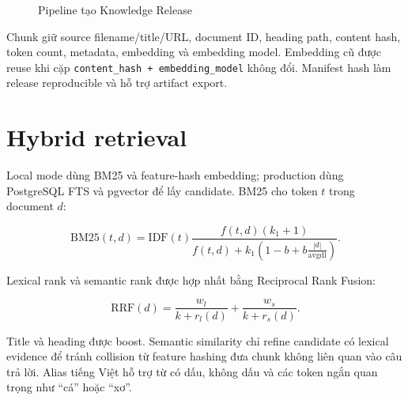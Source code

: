 \documentclass[12pt,a4paper]{report}
\newcommand{\code}[1]{\texttt{#1}}
\begin{document}
\begin{figure}[H]
\centering
{}
\caption{Pipeline tạo Knowledge Release}
\end{figure}

Chunk giữ source filename/title/URL, document ID, heading path, content hash,
token count, metadata, embedding và embedding model. Embedding cũ được reuse
khi cặp \code{content\_hash + embedding\_model} không đổi. Manifest hash làm
release reproducible và hỗ trợ artifact export.

\section{Hybrid retrieval}

Local mode dùng BM25 và feature-hash embedding; production dùng PostgreSQL FTS
và pgvector để lấy candidate. BM25 cho token $t$ trong document $d$:

\begin{equation}
\mathrm{BM25}(t,d)=\mathrm{IDF}(t)\frac{f(t,d)(k_1+1)}
{f(t,d)+k_1(1-b+b\frac{|d|}{\mathrm{avgdl}})}.
\end{equation}

Lexical rank và semantic rank được hợp nhất bằng Reciprocal Rank Fusion:

\begin{equation}
\mathrm{RRF}(d)=\frac{w_l}{k+r_l(d)}+\frac{w_s}{k+r_s(d)}.
\end{equation}

Title và heading được boost. Semantic similarity chỉ refine candidate có
lexical evidence để tránh collision từ feature hashing đưa chunk không liên
quan vào câu trả lời. Alias tiếng Việt hỗ trợ từ có dấu, không dấu và các token
ngắn quan trọng như ``cá'' hoặc ``xơ''.
\end{document}
